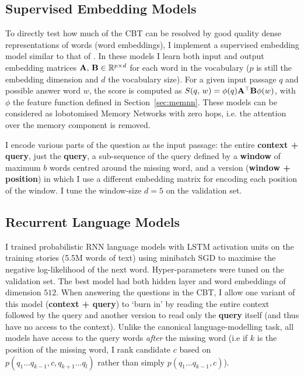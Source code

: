 \subsection{Supervised Embedding Models}
To directly test how much of the CBT can be resolved by good quality dense representations of words (word embeddings), I implement a supervised embedding model similar to that of \citep{weston2010large}. In these models I learn both input and output embedding matrices \({\bf A},\,{\bf B} \in \mathbb{R}^{p\times d}\) for each word in the vocabulary ($p$ is still the embedding dimension and $d$ the vocabulary size). For a given input passage \(q\) and possible answer word \(w\), the score is computed as \(S(q,\,w) = \phi(q) {\bf A} ^\top {\bf B} \phi(w) \), with \(\phi\) the feature function defined in Section~\ref{sec:memnn}.
These models can be considered as lobotomised Memory Networks with zero hops, 
i.e. the attention over the memory component is removed.

I encode various parts of the question as the input passage: the entire {\bf context + query}, just the {\bf query}, a sub-sequence of the query defined by a {\bf window} of maximum \(b\) words centred around the missing word, and a version ({\bf window + position}) in which I use a different embedding matrix  for encoding each position of the window. I tune the window-size \(d=5\) on the validation set. 


\subsection{Recurrent Language Models}
I trained probabilistic RNN language models with LSTM activation units on the training stories (5.5M words of text) using minibatch SGD to maximise the negative log-likelihood of the next word. Hyper-parameters were tuned on the validation set. The best model had both hidden layer and word embeddings of dimension $512$.
%
When answering the questions in the CBT, I allow one variant of this model ({\bf context + query}) to `burn in' by reading the entire context followed by the query and another version to read only the {\bf query} itself (and thus have no access to the context). Unlike the canonical language-modelling task, all models have access to the query words {\em after} the missing word (i.e if $k$ is the position of the missing word, I rank candidate \(c\) based on \(p(q_1 \dots q_{k-1}, c , q_{k+1} \dots q_l)\) rather than simply \(p(q_1 \dots q_{k-1},c)\)).

